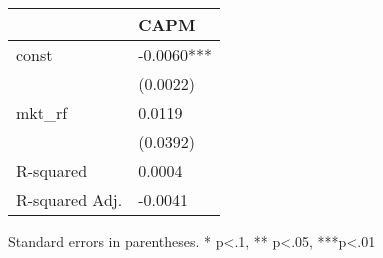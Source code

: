 \begin{table}
\caption{}
\label{}
\begin{center}
\begin{tabular}{ll}
\hline
               & CAPM        \\
\hline
const          & -0.0060***  \\
               & (0.0022)    \\
mkt\_rf        & 0.0119      \\
               & (0.0392)    \\
R-squared      & 0.0004      \\
R-squared Adj. & -0.0041     \\
\hline
\end{tabular}
\end{center}
\end{table}
\bigskip
Standard errors in parentheses. \newline 
* p<.1, ** p<.05, ***p<.01